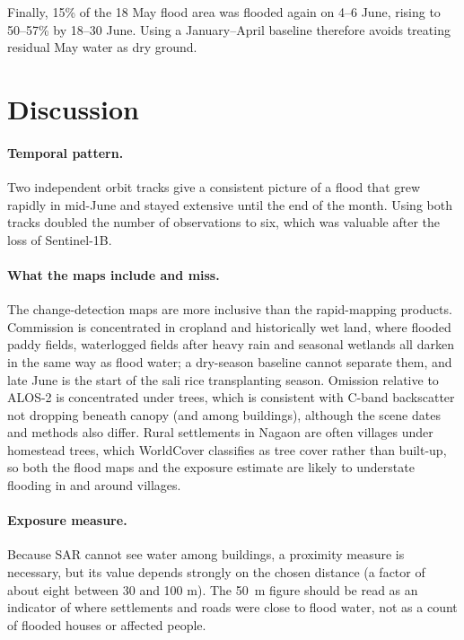 \documentclass[11pt,a4paper]{article}
\begin{document}
Finally, 15\% of the 18 May flood area was flooded again on 4--6 June, rising to 50--57\% by 18--30 June. Using a
January--April baseline therefore avoids treating residual May water as dry ground.

\section{Discussion}
\paragraph{Temporal pattern.} Two independent orbit tracks give a consistent picture of a flood that grew rapidly in
mid-June and stayed extensive until the end of the month. Using both tracks doubled the number of observations to six,
which was valuable after the loss of Sentinel-1B.

\paragraph{What the maps include and miss.} The change-detection maps are more inclusive than the rapid-mapping
products. Commission is concentrated in cropland and historically wet land, where flooded paddy fields, waterlogged
fields after heavy rain and seasonal wetlands all darken in the same way as flood water; a dry-season baseline cannot
separate them, and late June is the start of the sali rice transplanting season. Omission relative to ALOS-2 is
concentrated under trees, which is consistent with C-band backscatter not dropping beneath canopy (and among
buildings), although the scene dates and methods also differ. Rural settlements in Nagaon are often villages under
homestead trees, which WorldCover classifies as tree cover rather than built-up, so both the flood maps and the
exposure estimate are likely to understate flooding in and around villages.

\paragraph{Exposure measure.} Because SAR cannot see water among buildings, a proximity measure is necessary, but its
value depends strongly on the chosen distance (a factor of about eight between 30 and 100 m). The \SI{50}{m} figure
should be read as an indicator of where settlements and roads were close to flood water, not as a count of flooded
houses or affected people.
\end{document}
